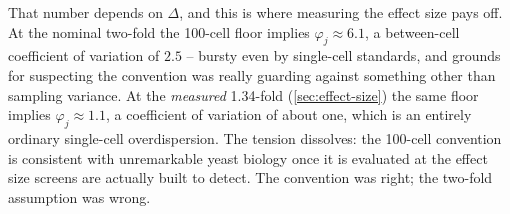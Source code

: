 That number depends on $\Delta$, and this is where measuring the effect size pays
off. At the nominal two-fold the 100-cell floor implies $\varphi_j\approx6.1$, a
between-cell coefficient of variation of $2.5$ -- bursty even by single-cell
standards, and grounds for suspecting the convention was really guarding against
something other than sampling variance. At the \emph{measured} 1.34-fold
(\cref{sec:effect-size}) the same floor implies $\varphi_j\approx1.1$, a
coefficient of variation of about one, which is an entirely ordinary
single-cell overdispersion. The tension dissolves: the 100-cell convention is
consistent with unremarkable yeast biology once it is evaluated at the effect
size screens are actually built to detect. The convention was right; the two-fold
assumption was wrong.



